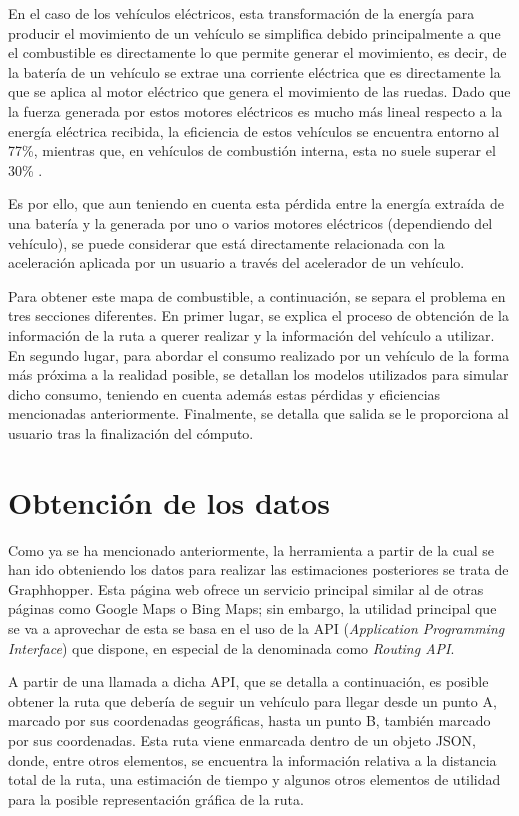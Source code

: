 \documentclass[11pt,spanish,listoffigures,listoftables]{tfgetsinf}
\begin{document}
En el caso de los vehículos eléctricos, esta transformación de la energía para producir el movimiento de un vehículo se simplifica debido principalmente a que el combustible es directamente lo que permite generar el movimiento, es decir, de la batería de un vehículo se extrae una corriente eléctrica que es directamente la que se aplica al motor eléctrico que genera el movimiento de las ruedas. Dado que la fuerza generada por estos motores eléctricos es mucho más lineal respecto a la energía eléctrica recibida, la eficiencia de estos vehículos se encuentra entorno al 77\%, mientras que, en vehículos de combustión interna, esta no suele superar el 30\% \cite{MILLER2011}.

Es por ello, que aun teniendo en cuenta esta pérdida entre la energía extraída de una batería y la generada por uno o varios motores eléctricos (dependiendo del vehículo), se puede considerar que está directamente relacionada con la aceleración aplicada por un usuario a través del acelerador de un vehículo.

Para obtener este mapa de combustible, a continuación, se separa el problema en tres secciones diferentes. En primer lugar, se explica el proceso de obtención de la información de la ruta a querer realizar y la información del vehículo a utilizar. En segundo lugar, para abordar el consumo realizado por un vehículo de la forma más próxima a la realidad posible, se detallan los modelos utilizados para simular dicho consumo, teniendo en cuenta además estas pérdidas y eficiencias mencionadas anteriormente. Finalmente, se detalla que salida se le proporciona al usuario tras la finalización del cómputo.

\section{Obtención de los datos}
\label{obtencion_de_datos}
Como ya se ha mencionado anteriormente, la herramienta a partir de la cual se han ido obteniendo los datos para realizar las estimaciones posteriores se trata de Graphhopper. Esta página web ofrece un servicio principal similar al de otras páginas como Google Maps o Bing Maps; sin embargo, la utilidad principal que se va a aprovechar de esta se basa en el uso de la API (\textit{Application Programming Interface}) que dispone, en especial de la denominada como \textit{Routing API}.

A partir de una llamada a dicha API, que se detalla a continuación, es posible obtener la ruta que debería de seguir un vehículo para llegar desde un punto A, marcado por sus coordenadas geográficas, hasta un punto B, también marcado por sus coordenadas. Esta ruta viene enmarcada dentro de un objeto JSON, donde, entre otros elementos, se encuentra la información relativa a la distancia total de la ruta, una estimación de tiempo y algunos otros elementos de utilidad para la posible representación gráfica de la ruta.
\end{document}
